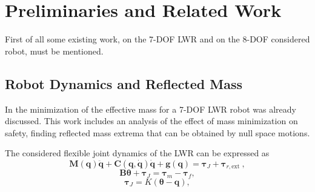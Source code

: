 \chapter{Preliminaries and Related Work}
\label{ch:Previouswork}


First of all some existing work, on the 7-DOF LWR and on the 8-DOF considered robot, must be mentioned.

\section{Robot Dynamics and Reflected Mass}
\label{sec:Nicostuff}
\label{sec:refl_mass_nico}




In \cite{paper_iros2017} the  minimization of the effective mass for a 7-DOF LWR robot was already discussed. This work includes an analysis of the effect of mass minimization on safety, finding reflected mass extrema that can be obtained by null space motions. 





The considered flexible joint dynamics of the LWR can be expressed as
\begin{equation}
\mathbf{M} (\mathbf{q}) \ddot{\mathbf{q}} + \mathbf{C}(\mathbf{q}, \dot{\mathbf{q}}) \dot{\mathbf{q}} + \mathbf{g}(\mathbf{q})  = \mathbf{\tau}_J + \mathbf{\tau}_{r,\mathrm{ext}} \label{eq:flex_dyn_1}  \ ,
\end{equation}
\begin{equation}
\mathbf{B} \mathbf{\theta} + \mathbf{\tau}_J  = \mathbf{\tau}_m - \mathbf{\tau}_f   ,
\end{equation}
\begin{equation}
\mathbf{\tau}_J  = K(\mathbf{\theta} - \mathbf{q})  , 
\end{equation}

